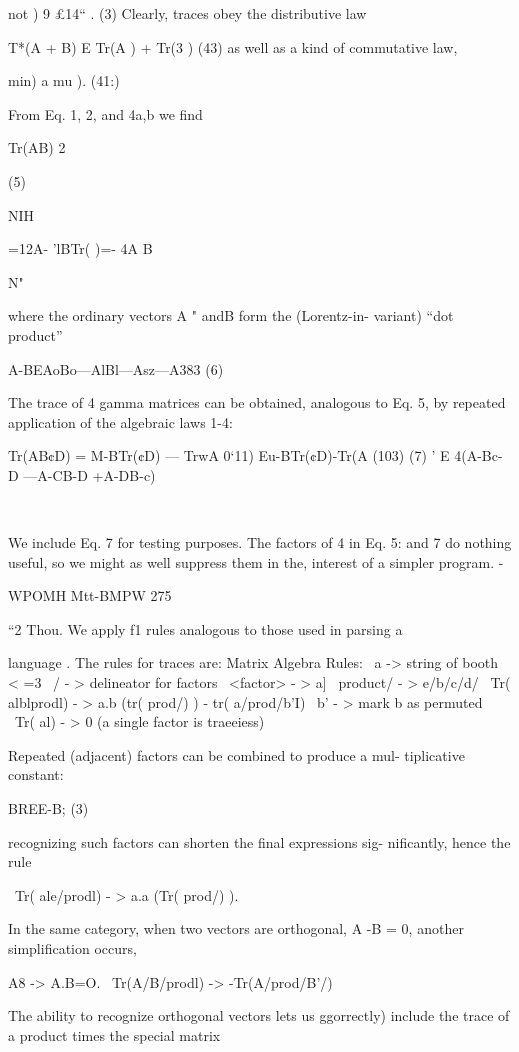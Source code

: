 not ) 9 £14“ . (3)
Clearly, traces obey the distributive law

T*(A + B) E Tr(A ) + Tr(3 ) (43)
as well as a kind of commutative law,

min) a mu ). (41:)

From Eq. 1, 2, and 4a,b we ﬁnd

Tr(AB) 2%

(5)

NIH

 

=12A- 'lBTr( )=- 4A B

N"

where the ordinary vectors A " andB form the (Lorentz-in-
variant) “dot product”

A-BEAoBo—AlBl—Asz—A383 (6)

The trace of 4 gamma matrices can be obtained, analogous to
Eq. 5, by repeated application of the algebraic laws 1-4:

Tr(AB¢D) = M-BTr(¢D) — TrwA 0‘11)
Eu-BTr(¢D)-Tr(A (103) (7) '
E 4(A-Bc-D —A-CB-D +A-DB-c)

\

We include Eq. 7 for testing purposes. The factors of 4 in Eq. 5:
and 7 do nothing useful, so we might as well suppress them in the,
interest of a simpler program. -

 

WPOMH Mtt-BMPW 275

“2 Thou.
We apply f1 rules analogous to those used in parsing a

language . The rules for traces are:
\Gemma Matrix Algebra Rules:
\ a -> string of booth < =3
\ / - > delineator for factors
\ <factor> - > a]
\ product/ - > e/b/c/d/
\ Tr( alblprodl) - > a.b (tr( prod/) ) - tr( a/prod/b'I)
\ b' - > mark b as permuted
\ Tr( al) - > 0 (a single factor is traeeiess)

Repeated (adjacent) factors can be combined to produce a mul-
tiplicative constant:

BREE-B; (3)

recognizing such factors can shorten the ﬁnal expressions sig-
niﬁcantly, hence the rule

\ Tr( ale/prodl) - > a.a (Tr( prod/) ).

In the same category, when two vectors are orthogonal,
A -B = 0, another simpliﬁcation occurs,

\PERP A8 -> A.B=O.
\ Tr(A/B/prodl) -> -Tr(A/prod/B'/)

The ability to recognize orthogonal vectors lets us ggorrectly)
include the trace of a product times the special matrix

